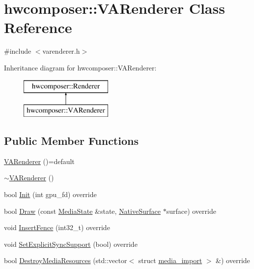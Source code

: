 \hypertarget{classhwcomposer_1_1VARenderer}{}\section{hwcomposer\+:\+:V\+A\+Renderer Class Reference}
\label{classhwcomposer_1_1VARenderer}


{\ttfamily \#include $<$varenderer.\+h$>$}

Inheritance diagram for hwcomposer\+:\+:V\+A\+Renderer\+:\begin{figure}[H]
\begin{center}
\leavevmode
\includegraphics[height=2.000000cm]{classhwcomposer_1_1VARenderer}
\end{center}
\end{figure}
\subsection*{Public Member Functions}
\begin{DoxyCompactItemize}
\item 
\mbox{\hyperlink{classhwcomposer_1_1VARenderer_a7ba9e072366652966ab3a3007a779cec}{V\+A\+Renderer}} ()=default
\item 
\mbox{\hyperlink{classhwcomposer_1_1VARenderer_affd21547dc812a4a39b1b5dbba33c9af}{$\sim$\+V\+A\+Renderer}} ()
\item 
bool \mbox{\hyperlink{classhwcomposer_1_1VARenderer_a93d5e911647cee44c892222c822df619}{Init}} (int gpu\+\_\+fd) override
\item 
bool \mbox{\hyperlink{classhwcomposer_1_1VARenderer_a5fdcb230093416433e8cf394137b9cc1}{Draw}} (const \mbox{\hyperlink{structhwcomposer_1_1MediaState}{Media\+State}} \&state, \mbox{\hyperlink{classhwcomposer_1_1NativeSurface}{Native\+Surface}} $\ast$surface) override
\item 
void \mbox{\hyperlink{classhwcomposer_1_1VARenderer_aece2e9617febe0b91087342ce84812e2}{Insert\+Fence}} (int32\+\_\+t) override
\item 
void \mbox{\hyperlink{classhwcomposer_1_1VARenderer_a863e73b1d84e194300aac6f6c30fd037}{Set\+Explicit\+Sync\+Support}} (bool) override
\item 
bool \mbox{\hyperlink{classhwcomposer_1_1VARenderer_a0db23648105f69ce00fea498f28f87ec}{Destroy\+Media\+Resources}} (std\+::vector$<$ struct \mbox{\hyperlink{structhwcomposer_1_1media__import}{media\+\_\+import}} $>$ \&) override
\end{DoxyCompactItemize}


